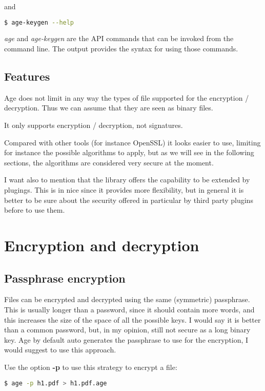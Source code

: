 \documentclass{article}
\begin{document}
	and
	
	\begin{lstlisting}[language=bash]
	$ age-keygen --help
	\end{lstlisting}
	
	\emph{age} and \emph{age-keygen} are the API commands that can be invoked from the command line.
	The output provides the syntax for using those commands.
	
	\subsection{Features}
	
	Age does not limit in any way the types of file supported for the encryption / decryption.
	Thus we can assume that they are seen as binary files.
	
	It only supports encryption / decryption, not signatures.
	
	Compared with other tools (for instance OpenSSL) it looks easier to use,
	limiting for instance the possible algorithms to apply, but as we will see in the following sections,
	the algorithms are considered very secure at the moment.
	
	I want also to mention that the library offers the capability to be extended by plugings.
	This is in nice since it provides more flexibility, but
	in general it is better to be sure about the security offered in particular by third party plugins before to use them.
	
	\section{Encryption and decryption}
	
	\subsection{Passphrase encryption}
	
	Files can be encrypted and decrypted using the same (symmetric)  passphrase.
	This is usually longer than a password, since it should contain more words, and this increases the size
	of the space of all the possible keys.
	I would say it is better than a common password, but, in my opinion, still not secure as a long binary key.
	Age by default auto generates the passphrase to use for the encryption, I would suggest to use this approach.
	
	\medskip
	
	\noindent Use the option \textbf{-p} to use this strategy to encrypt a file:
	\begin{lstlisting}[language=bash]
	$ age -p h1.pdf > h1.pdf.age
	\end{lstlisting}
	
\end{document}
